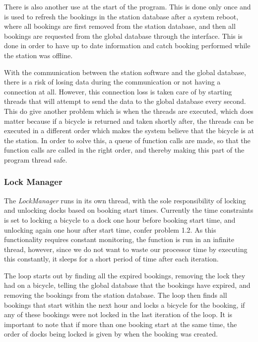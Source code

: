 There is also another use at the start of the program.
This is done only once and is used to refresh the bookings in the station database after a system reboot, where all bookings are first removed from the station database, and then all bookings are requested from the global database through the interface.
This is done in order to have up to date information and catch booking performed while the station was offline.

With the communication between the station software and the global database, there is a risk of losing data during the communication or not having a connection at all.
However, this connection loss is taken care of by starting threads that will attempt to send the data to the global database every second.
This do give another problem which is when the threads are executed, which does matter because if a bicycle is returned and taken shortly after, the threads can be executed in a different order which makes the system believe that the bicycle is at the station. 
In order to solve this, a queue of function calls are made, so that the function calls are called in the right order, and thereby making this part of the program thread safe.

\subsubsection{Lock Manager}
The \textit{LockManager} runs in its own thread, with the sole responsibility of locking and unlocking docks based on booking start times. 
Currently the time constraints is set to locking a bicycle to a dock one hour before booking start time, and unlocking again one hour after start time, confer  problem 1.2. 
As this functionality requires constant monitoring, the function is run in an infinite thread, however, since we do not want to waste our processor time by executing this constantly, it sleeps for a short period of time after each iteration.

The loop starts out by finding all the expired bookings, removing the lock they had on a bicycle, telling the global database that the bookings have expired, and removing the bookings from the station database.
The loop then finds all bookings that start within the next hour and locks a bicycle for the booking, if any of these bookings were not locked in the last iteration of the loop. 
It is important to note that if more than one booking start at the same time, the order of docks being locked is given by when the booking was created. 

